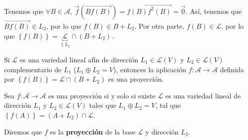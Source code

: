 \begin{observation}
	\normalfont Tenemos que $\displaystyle \forall B \in \mathcal{A} $, $\displaystyle \vec{f}\left(\overrightarrow{Bf\left(B\right)} \right) = \overrightarrow{f\left(B\right)f^{2}\left(B\right)} = \vec{0}$. Así, tenemos que $\displaystyle \overrightarrow{Bf\left(B\right)} \in L_{2} $, por lo que $\displaystyle f\left(B\right) \in B + L_{2} $. Por otra parte, $\displaystyle f\left(B\right) \in \mathcal{L} $, por lo que $\displaystyle \left\{ f\left(B\right)\right\} = \underbrace{\mathcal{L}}_{\|L_{1}} \cap \left(B + L_{2}\right) $.
\end{observation}
\begin{observation}
	\normalfont Si $\displaystyle \mathcal{L} $ es una variedad lineal afín de dirección $\displaystyle L_{1} \in \mathcal{L}\left(V\right) $ y $\displaystyle L_{2} \in \mathcal{L}\left(V\right) $ complementario de $\displaystyle L_{1} $ ($\displaystyle L_{1} \oplus L_{2} = V $), entonces la aplicación $\displaystyle f : \mathcal{A} \to \mathcal{A} $ definida por $\displaystyle \left\{ f\left(B\right)\right\} = \mathcal{L} \cap \left(B + L_{2}\right)$ es una proyección.
\end{observation}
\begin{ftheorem}[]
	\normalfont Sea $\displaystyle f : \mathcal{A} \to \mathcal{A} $ es una proyección si y solo si existe $\displaystyle \mathcal{L} $ es una variedad lineal de dirección $\displaystyle L_{1} $ y $\displaystyle L_{2} \in \mathcal{L}\left(V\right)$ tales que $\displaystyle L_{1}\oplus L_{2} = V $, tal que $\displaystyle \left\{ f\left(A\right)\right\} = \left(A + L_{2}\right) \cap \mathcal{L} $.
\end{ftheorem}
\begin{fdefinition}[]
\normalfont Diremos que $\displaystyle f $ es la \textbf{proyección} de la base $\displaystyle \mathcal{L} $ y dirección $\displaystyle L_{2} $.
\end{fdefinition}
